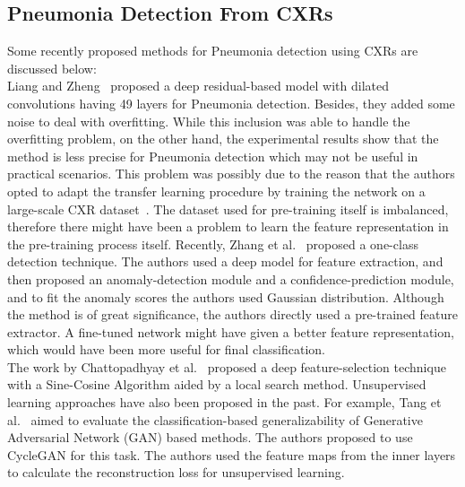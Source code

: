 \documentclass[final,3p,times]{elsarticle}
\begin{document}
\subsection{Pneumonia Detection From CXRs}
Some recently proposed methods {for} Pneumonia detection using CXRs are discussed below:\\
Liang and Zheng~\cite{liang2020transfer} proposed a deep residual-based model with dilated convolutions {having} 49 layers for Pneumonia detection. {Besides, they added some noise} to deal with overfitting. While this inclusion was able to handle the overfitting problem, on the other hand, the experimental results show that the method is less precise for Pneumonia detection which may not be useful in practical scenarios. This problem was possibly due to the reason that the authors opted to adapt the transfer learning procedure by training the network on a large-scale CXR dataset~\cite{wang2017chestx}. The dataset used for pre-training itself is imbalanced, therefore there might have been a problem to learn the feature representation in the pre-training process itself. Recently, Zhang et al.~\cite{zhang2021viral} proposed a one-class detection technique. {The authors used a deep model for feature extraction, and then} proposed an anomaly-detection module and a confidence-prediction module, and to fit the anomaly scores the authors used Gaussian distribution. Although the method is of great significance, the authors directly used a pre-trained feature extractor. A {fine-tuned} network might have given a better feature {representation,} which would have been {more useful} for final classification.\\
The work by Chattopadhyay et al.~\cite{chattopadhyay2021Pneumonia} proposed a deep feature-selection technique with a Sine-Cosine Algorithm aided by a local search method. Unsupervised learning approaches have also been proposed in the past. For example, Tang et al.~\cite{tang2019tuna} aimed to evaluate the classification-based generalizability of Generative Adversarial Network (GAN) based methods. The authors proposed to use CycleGAN for this task. The authors used the feature maps from the inner layers to calculate the reconstruction loss for unsupervised learning.\\
\end{document}
